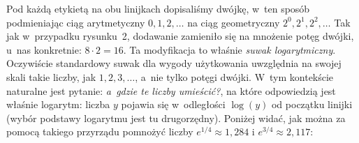 \rightline{
\hspace{1mm}
}

Pod każdą etykietą na obu linijkach dopisaliśmy dwójkę, w~ten sposób podmieniając ciąg arytmetyczny $0,1,2,\ldots$ na ciąg geometryczny $2^0,2^1,2^2,\ldots$ Tak jak w~przypadku rysunku~2, dodawanie zamieniło się na mnożenie potęg dwójki, u~nas konkretnie: $8 \cdot 2 = 16$. Ta modyfikacja to właśnie \emph{suwak logarytmiczny}. Oczywiście standardowy suwak dla wygody użytkowania uwzględnia na swojej skali takie liczby, jak $1,2,3,\ldots$, a~nie tylko potęgi dwójki. W~tym kontekście naturalne jest pytanie: \emph{a~gdzie te liczby umieścić?}, na które odpowiedzią jest właśnie logarytm: liczba $y$ pojawia się w~odległości $\log(y)$ od początku linijki (wybór podstawy logarytmu jest tu drugorzędny). Poniżej widać, jak można za pomocą takiego przyrządu pomnożyć liczby $e^{1/4} \approx 1{,}284$ i $e^{3/4} \approx 2{,}117$: 




